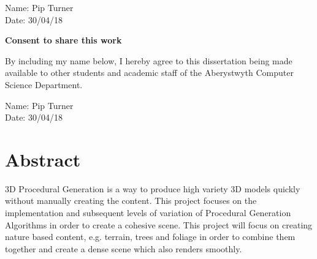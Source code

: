 \documentclass[a4paper,10pt]{report}
\begin{document}
\vspace{2em}
Name: Pip Turner  \\

\vspace{1em}
Date: 30/04/18 \\

\vspace{1em}
\begin{center}
    {\LARGE\bf Consent to share this work}
\end{center}

By including my name below, I hereby agree to this dissertation being made available to other students and academic staff of the Aberystwyth Computer Science Department.  

\vspace{2em}
Name: Pip Turner  \\

\vspace{1em}
Date: 30/04/18 \\

\setlength{\headheight}{25.2pt}
\pagestyle{fancy}
\setlength{\headsep}{0.2in}
\fancyhf{}

\fancyhead[L]{\leftmark}
\fancyhead[R]{\rightmark}

\fancyfoot[C]{\thepage}

\listoffigures
\listoftables

\tableofcontents
\clearpage

\section{Abstract}
3D Procedural Generation is a way to produce high variety 3D models quickly without manually creating the content. This project focuses on the implementation and subsequent levels of variation of Procedural Generation Algorithms in order to create a cohesive scene. This project will focus on creating nature based content, e.g. terrain, trees and foliage in order to combine them together and create a dense scene which also renders smoothly. \medskip
\end{document}
